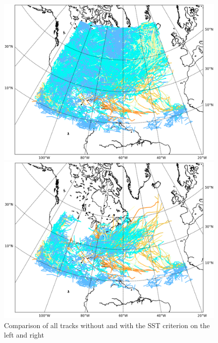 \begin{figure}[!htb]
	\begin{minipage}[t]{0.48\textwidth}
		\includegraphics[width = \textwidth]{img/all_tracks.png}
	\end{minipage}
	\hfill
	\begin{minipage}[t]{0.48\textwidth}
		\includegraphics[width = \textwidth]{img/all_tracks_sst.png}
	\end{minipage}
	\caption{Comparison of all tracks without and with the SST criterion on the left and right}
	\label{fig:sst-effect}
\end{figure}

